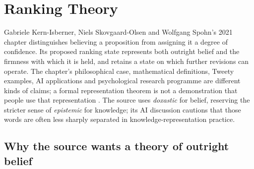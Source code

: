 \chapter{Ranking Theory}
\label{sec:p15-rationality-5-3}

Gabriele Kern-Isberner, Niels Skovgaard-Olsen and Wolfgang Spohn's
2021 chapter distinguishes believing a proposition from assigning it a
degree of confidence.  Its proposed ranking state represents both outright
belief and the firmness with which it is held, and retains a state on which
further revisions can operate.  The chapter's philosophical case, mathematical
definitions, Tweety examples, AI applications and psychological research
programme are different kinds of claims; a formal representation theorem is
not a demonstration that people use that representation
\parencite[pp.~337--345]{KernIsbernerSkovgaardOlsenSpohn2021Ranking}.
The source uses \emph{doxastic} for belief, reserving the stricter sense of
\emph{epistemic} for knowledge; its AI discussion cautions that those words
are often less sharply separated in knowledge-representation practice.

\section{Why the source wants a theory of outright belief}
\label{sec:p15-w02b-p15-039-motivation}

